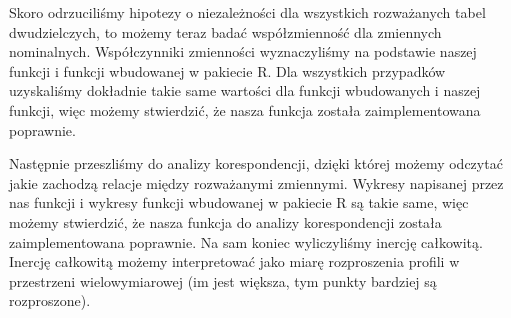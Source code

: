 \documentclass[12pt]{mwart}
\begin{document}
Skoro odrzuciliśmy hipotezy o niezależności dla wszystkich rozważanych tabel dwudzielczych, to możemy teraz badać współzmienność dla zmiennych nominalnych. Współczynniki zmienności wyznaczyliśmy na podstawie naszej funkcji i funkcji wbudowanej w pakiecie R. Dla wszystkich przypadków uzyskaliśmy dokładnie takie same wartości dla funkcji wbudowanych i naszej funkcji, więc możemy stwierdzić, że nasza funkcja została zaimplementowana poprawnie.

Następnie przeszliśmy do analizy korespondencji, dzięki której możemy odczytać jakie zachodzą relacje między rozważanymi zmiennymi. Wykresy napisanej przez nas funkcji i wykresy funkcji wbudowanej w pakiecie R są takie same, więc możemy stwierdzić, że nasza funkcja do analizy korespondencji została zaimplementowana poprawnie. Na sam koniec wyliczyliśmy inercję całkowitą. Inercję całkowitą możemy interpretować jako miarę rozproszenia profili w przestrzeni wielowymiarowej (im jest większa, tym punkty bardziej są rozproszone).
\end{document}
